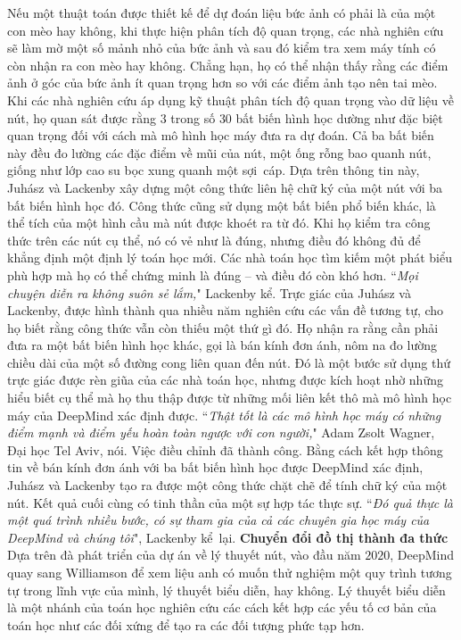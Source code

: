 \begin{multicols}{2}
	\vskip 0.05cm
	Nếu một thuật toán được thiết kế để dự đoán liệu bức ảnh có phải là của một con mèo hay không, khi thực hiện phân tích độ quan trọng, các nhà nghiên cứu sẽ làm mờ một số mảnh nhỏ của bức ảnh và sau đó kiểm tra xem máy tính có còn nhận ra con mèo hay không. Chẳng hạn, họ có thể nhận thấy rằng các điểm ảnh ở góc của bức ảnh ít quan trọng hơn so với các điểm ảnh tạo nên tai mèo.
	\vskip 0.05cm
	Khi các nhà nghiên cứu áp dụng kỹ thuật phân tích độ quan trọng vào dữ liệu về nút, họ quan sát được rằng $3$ trong số $30$ bất biến hình học dường như đặc biệt quan trọng đối với cách mà mô hình học máy đưa ra dự đoán. Cả ba bất biến này đều đo lường các đặc điểm về mũi của nút, một ống rỗng bao quanh nút, giống như lớp cao su bọc xung quanh một sợi~cáp.
	\vskip 0.05cm
	Dựa trên thông tin này, Juhász và Lackenby xây dựng một công thức liên hệ chữ ký của một nút với ba bất biến hình học đó. Công thức cũng sử dụng một bất biến phổ biến khác, là thể tích của một hình cầu mà nút được khoét ra từ đó. Khi họ kiểm tra công thức trên các nút cụ thể, nó có vẻ như là đúng, nhưng điều đó không đủ để khẳng định một định lý toán học mới. Các nhà toán học tìm kiếm một phát biểu phù hợp mà họ có thể chứng minh là đúng -- và điều đó còn khó hơn.
	\vskip 0.05cm
	``\textit{Mọi chuyện diễn ra không suôn sẻ lắm,}" Lackenby kể.
	\vskip 0.05cm
	Trực giác của Juhász và Lackenby, được hình thành qua nhiều năm nghiên cứu các vấn đề tương tự, cho họ biết rằng công thức vẫn còn thiếu một thứ gì đó. Họ nhận ra rằng cần phải đưa ra một bất biến hình học khác, gọi là bán kính đơn ánh, nôm na đo lường chiều dài của một số đường cong liên quan đến nút. Đó là một bước sử dụng thứ trực giác được rèn giũa của các nhà toán học, nhưng được kích hoạt nhờ những hiểu biết cụ thể mà họ thu thập được từ những mối liên kết thô mà mô hình học máy của DeepMind xác định được.
	\vskip 0.05cm
	``\textit{Thật tốt là các mô hình học máy có những điểm mạnh và điểm yếu hoàn toàn ngược với con người,}" Adam Zsolt Wagner, Đại học Tel Aviv, nói.
	\vskip 0.05cm
	Việc điều chỉnh đã thành công. Bằng cách kết hợp thông tin về bán kính đơn ánh với ba bất biến hình học được DeepMind xác định, Juhász và Lackenby tạo ra được một công thức chặt chẽ để tính chữ ký của một nút. Kết quả cuối cùng có tinh thần của một sự hợp tác thực sự.
	\vskip 0.05cm
	\columnbreak
	``\textit{Đó quả thực là một quá trình nhiều bước, có sự tham gia của cả các chuyên gia học máy của DeepMind và chúng tôi}", Lackenby kể~lại.
	\vskip 0.05cm
	\textbf{\color{duongvaotoanhoc}Chuyển đổi đồ thị thành đa thức}
	\vskip 0.05cm
	Dựa trên đà phát triển của dự án về lý thuyết nút, vào đầu năm $2020$, DeepMind quay sang  Williamson để xem liệu anh có muốn thử nghiệm một quy trình tương tự trong lĩnh vực của mình, lý thuyết biểu diễn, hay không. Lý thuyết biểu diễn là một nhánh của toán học nghiên cứu các cách kết hợp các yếu tố cơ bản của toán học như các đối xứng để tạo ra các đối tượng phức tạp hơn.

\end{multicols}
